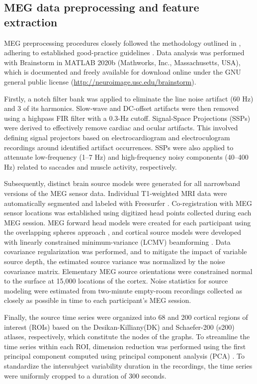 \documentclass{cys}
\begin{document}
\bigskip
\subsection{MEG data preprocessing and feature extraction}

MEG preprocessing procedures closely followed the methodology outlined in \cite{da2021brief}, adhering to established good-practice guidelines \cite{gross2013good}. Data analysis was performed with Brainstorm\cite{tadel2011brainstorm} in MATLAB 2020b (Mathworks, Inc., Massachusetts, USA), which is documented and freely available for download online under the GNU general public license (\url{http://neuroimage.usc.edu/brainstorm}).

\bigskip
Firstly, a notch filter bank was applied to eliminate the line noise artifact (60 Hz) and 3 of its harmonics. Slow-wave and DC-offset artifacts were then removed using a highpass FIR filter with a 0.3-Hz cutoff. Signal-Space Projections (SSPs) \cite{uusitalo1997signal} were derived to effectively remove cardiac and ocular artifacts. This involved defining signal projectors based on electrocardiogram and electroculogram recordings around identified artifact occurrences. SSPs were also applied to attenuate low-frequency (1–7 Hz) and high-frequency noisy components (40–400 Hz) related to saccades and muscle activity, respectively.

\bigskip
Subsequently, distinct brain source models were generated for all narrowband versions of the MEG sensor data. Individual T1-weighted MRI data were automatically segmented and labeled with Freesurfer \cite{dale1999cortical}. Co-registration with MEG sensor locations was established using digitized head points collected during each MEG session. MEG forward head models were created for each participant using the overlapping spheres approach \cite{huang1999sensor}, and cortical source models were developed with linearly constrained minimum-variance (LCMV) beamforming \cite{zhang2015linearly}. Data covariance regularization was performed, and to mitigate the impact of variable source depth, the estimated source variance was normalized by the noise covariance matrix. Elementary MEG source orientations were constrained normal to the surface at 15,000 locations of the cortex. Noise statistics for source modeling were estimated from two-minute empty-room recordings collected as closely as possible in time to each participant’s MEG session.

\bigskip
Finally, the source time series were organized into 68 and 200 cortical regions of interest (ROIs) based on the Desikan-Killiany(DK) and Schaefer-200 (s200) atlases, respectively, which constitute the nodes of the graphs. To streamline the time series within each ROI, dimension reduction was performed using the first principal component computed using principal component analysis (PCA) \cite{wold1987principal}. To standardize the intersubject variability duration in the recordings, the time series were uniformly cropped to a duration of 300 seconds.
\end{document}
